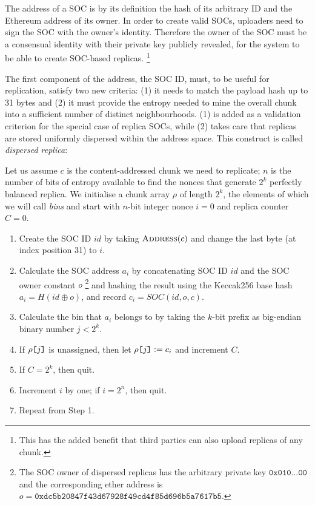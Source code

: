 \documentclass[manuscript,screen,review]{acmart}
\newcommand{\idx}[1]{\texttt{[}\/#1\/\texttt{]}}
\DeclareMathOperator{\concat}{\operatorname{\oplus}}
\begin{document}
The address of a SOC is by its definition the hash of its arbitrary ID and the Ethereum address of its owner. In order to create valid SOCs, uploaders need to sign the SOC with the owner's identity. Therefore the owner of the SOC must be a consensual identity with their private key publicly revealed, for the system to be able to create SOC-based replicas.%
%
\footnote{This has the added benefit that third parties can also upload replicas of any chunk.}

The first component of the address, the SOC ID, must, to be useful for replication, satisfy two new criteria: (1) it needs to match the payload hash up to 31 bytes and (2) it must provide the entropy needed to mine the overall chunk into a sufficient number of distinct neighbourhoods. (1) is added as a validation criterion for the special case of replica SOCs, while (2) takes care that replicas are stored uniformly dispersed within the address space.
This construct is called \emph{dispersed replica}:

Let us assume $c$ is the content-addressed chunk we need to replicate; $n$ is the number of bits of entropy available to find the nonces that generate  $2^k$  perfectly balanced replica. We initialise a chunk array $\rho$ of length $2^k$, the elements of which we will call \emph{bins} and start with $n$-bit integer nonce $i=0$ and replica counter $C=0$.

\begin{enumerate}[noitemsep]
  \item Create the SOC ID $id$ by taking $\textsc{Address}(c)$ and change the last byte (at index position 31) to  $i$.
  \item Calculate the SOC address $a_i$ by concatenating SOC ID $id$ and the SOC owner constant $o$%
%
\footnote{The SOC owner of dispersed replicas has the arbitrary private key $\texttt{0x010...00}$
and the corresponding ether address is
$o = \texttt{0xdc5b20847f43d67928f49cd4f85d696b5a7617b5} $.}
%
and hashing the result using the Keccak256 base hash $a_i=H(id\concat o)$, and record $c_i=\mathit{SOC}(id,o,c)$.
  \item Calculate the bin that $a_i$ belongs to by taking the $k$-bit prefix as big-endian binary number $j<2^k$.
  \item If $\rho\idx{j}$ is unassigned, then let $\rho\idx{j}:=c_i$ and increment $C$.
  \item If $C=2^k$, then quit.
  \item Increment $i$ by one; if $i=2^n$, then quit.
  \item Repeat from Step 1.
\end{enumerate}
\end{document}
